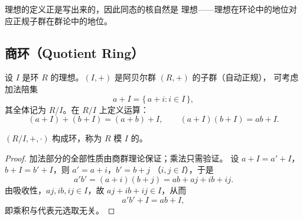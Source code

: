 \begin{strand}
理想的定义正是写出来的，因此同态的核自然是
理想——理想在环论中的地位对应正规子群在群论中的地位。
\end{strand}

\subsection{商环（Quotient Ring）}

设 $I$ 是环 $R$ 的理想。$(I,+)$ 是阿贝尔群 $(R,+)$ 的子群（自动正规），
可考虑加法陪集
\[
  a + I = \{\,a + i : i\in I\,\},
\]
其全体记为 $R/I$。在 $R/I$ 上定义运算：
\[
  (a+I) + (b+I) = (a+b) + I, \qquad (a+I)(b+I) = ab + I.
\]

\begin{theorem}[商环]
$(R/I, +, \cdot)$ 构成环，称为 $R$ 模 $I$ 的。
\end{theorem}

\begin{proof}
加法部分的全部性质由商群理论保证；乘法只需验证。
设 $a + I = a' + I$，$b + I = b' + I$，则 $a' = a + i$，$b' = b + j$
（$i,j\in I$），于是
\[
  a'b' = (a+i)(b+j) = ab + aj + ib + ij.
\]
由吸收性，$aj, ib, ij\in I$，故 $aj + ib + ij\in I$，从而
\[
  a'b' + I = ab + I,
\]
即乘积与代表元选取无关。
\end{proof}
